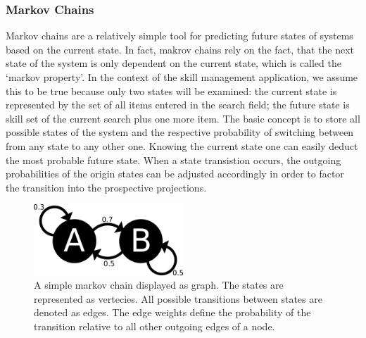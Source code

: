 \subsubsection{Markov Chains}
Markov chains are a relatively simple tool for predicting future states of systems based on the current state. In fact, makrov chains rely on the fact, that the next state of the system is only dependent on the current state, which is called the `markov property'. In the context of the skill management application, we assume this to be true because only two states will be examined: the current state is represented by the set of all items entered in the search field; the future state is skill set of the current search plus one more item.
The basic concept is to store all possible states of the system and the respective probability of switching between from any state to any other one.
Knowing the current state one can easily deduct the most probable future state. When a state transistion occurs, the outgoing probabilities of the origin states
can be adjusted accordingly in order to factor the transition into the prospective projections.
\begin{figure}[!htp]
    \centering
    \includegraphics[width=0.5\textwidth]{images/markov-chain.png}
    \caption[Markov Chain]{A simple markov chain displayed as graph. The states are represented as vertecies. All possible transitions between states are denoted as edges. The edge weights define the probability of the transition relative to all other outgoing edges of a node.}
    \label{fig:markovchain}
\end{figure}


